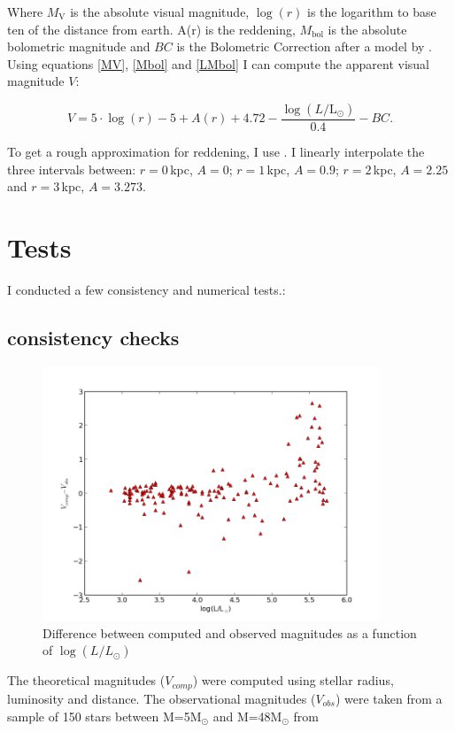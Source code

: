\documentclass[a4paper,10pt]{article}
\begin{document}
 Where $M_{\mathrm{V}}$ is the absolute visual magnitude, $\log(r)$ is the logarithm to base ten of the distance from earth. A(r) is the reddening,
 $M_{\mathrm{bol}}$ is the absolute bolometric magnitude and $BC$ is the Bolometric Correction after a model by \citep*{1996ApJ...469..355F}.
 Using equations \ref{MV}, \ref{Mbol} and \ref{LMbol} I can compute the apparent visual magnitude $V$:
 
 \begin{equation}
  V=5\cdot\log(r)-5+A(r)+4.72-\frac{\log(L/\mathrm{L}_\odot)}{0.4}-BC.
 \end{equation}
 
 To get a rough approximation for reddening, I use \citet*[Figure 9]{2005AJ....130..659A}. I linearly interpolate the three intervals between:
 $r=0\,$kpc, $A=0$; $r=1\,$kpc, $A=0.9$; $r=2\,$kpc, $A=2.25$ and $r=3\,$kpc, $A=3.273$. 
 
 
 \newpage
 \section{Tests}
 I conducted a few consistency and numerical tests.:
 
 \subsection{consistency checks}
  \begin{figure}[h!]
  \includegraphics[width=0.9\textwidth]{diffmaglogL}
  \caption{Difference between computed and observed magnitudes as a function of $\log(L/L_\odot)$}
 \end{figure}
 
 The theoretical magnitudes ($V_{comp}$) were computed using stellar radius, luminosity and distance. The observational magnitudes ($V_{obs}$)
 were taken from a sample of 150 stars between M=5M$_\odot$ and M=48M$_\odot$ from \citep{2014A&A...570L..13C}
 
\end{document}
